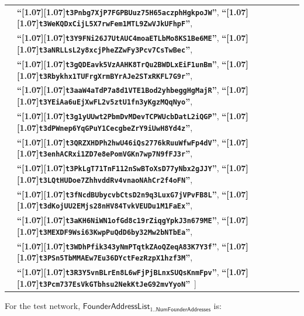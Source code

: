 \documentclass{article}
\let\oldtexttt\texttt
\renewcommand{\texttt}[1]{\scalebox{0.97}[1.07]{\oldtexttt{#1}}}
\newcommand{\introlist}{\needspace{15ex}}
\numberwithin{theorem}{subsection}
\newcommand{\ascii}[1]{\textbf{``\texttt{#1}''}}
\newcommand{\oneto}[1]{\mathrm{1}..{#1}}
\newcommand{\NumFounderAddresses}{\mathsf{NumFounderAddresses}}
\newcommand{\FounderAddressList}{\mathsf{FounderAddressList}}
\begin{document}
{\begin{tabular}{@{\hskip 2.5em}l@{\;}l}
 & \ascii{t3Pnbg7XjP7FGPBUuz75H65aczphHgkpoJW}, \ascii{t3WeKQDxCijL5X7rwFem1MTL9ZwVJkUFhpF}, \\
 & \ascii{t3Y9FNi26J7UtAUC4moaETLbMo8KS1Be6ME}, \ascii{t3aNRLLsL2y8xcjPheZZwFy3Pcv7CsTwBec}, \\
 & \ascii{t3gQDEavk5VzAAHK8TrQu2BWDLxEiF1unBm}, \ascii{t3Rbykhx1TUFrgXrmBYrAJe2STxRKFL7G9r}, \\
 & \ascii{t3aaW4aTdP7a8d1VTE1Bod2yhbeggHgMajR}, \ascii{t3YEiAa6uEjXwFL2v5ztU1fn3yKgzMQqNyo}, \\
 & \ascii{t3g1yUUwt2PbmDvMDevTCPWUcbDatL2iQGP}, \ascii{t3dPWnep6YqGPuY1CecgbeZrY9iUwH8Yd4z}, \\
 & \ascii{t3QRZXHDPh2hwU46iQs2776kRuuWfwFp4dV}, \ascii{t3enhACRxi1ZD7e8ePomVGKn7wp7N9fFJ3r}, \\
 & \ascii{t3PkLgT71TnF112nSwBToXsD77yNbx2gJJY}, \ascii{t3LQtHUDoe7ZhhvddRv4vnaoNAhCr2f4oFN}, \\
 & \ascii{t3fNcdBUbycvbCtsD2n9q3LuxG7jVPvFB8L}, \ascii{t3dKojUU2EMjs28nHV84TvkVEUDu1M1FaEx}, \\
 & \ascii{t3aKH6NiWN1ofGd8c19rZiqgYpkJ3n679ME}, \ascii{t3MEXDF9Wsi63KwpPuQdD6by32Mw2bNTbEa}, \\
 & \ascii{t3WDhPfik343yNmPTqtkZAoQZeqA83K7Y3f}, \ascii{t3PSn5TbMMAEw7Eu36DYctFezRzpX1hzf3M}, \\
 & \ascii{t3R3Y5vnBLrEn8L6wFjPjBLnxSUQsKnmFpv}, \ascii{t3Pcm737EsVkGTbhsu2NekKtJeG92mvYyoN}\, ]
\end{tabular}
} %

\vspace{1ex}
\introlist
For the test network, $\FounderAddressList_{\oneto{\NumFounderAddresses}}$ is:
\end{document}

